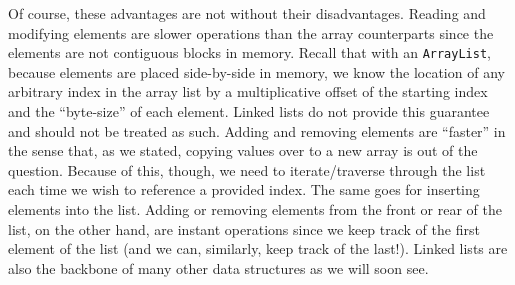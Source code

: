 Of course, these advantages are not without their disadvantages. Reading and modifying elements are slower operations than the array counterparts since the elements are not contiguous blocks in memory. Recall that with an \texttt{ArrayList}, because elements are placed side-by-side in memory, we know the location of any arbitrary index in the array list by a multiplicative offset of the starting index and the ``byte-size'' of each element. Linked lists do not provide this guarantee and should not be treated as such. Adding and removing elements are ``faster'' in the sense that, as we stated, copying values over to a new array is out of the question. Because of this, though, we need to iterate/traverse through the list each time we wish to reference a provided index. The same goes for inserting elements into the list. Adding or removing elements from the front or rear of the list, on the other hand, are instant operations since we keep track of the first element of the list (and we can, similarly, keep track of the last!). Linked lists are also the backbone of many other data structures as we will soon see.
